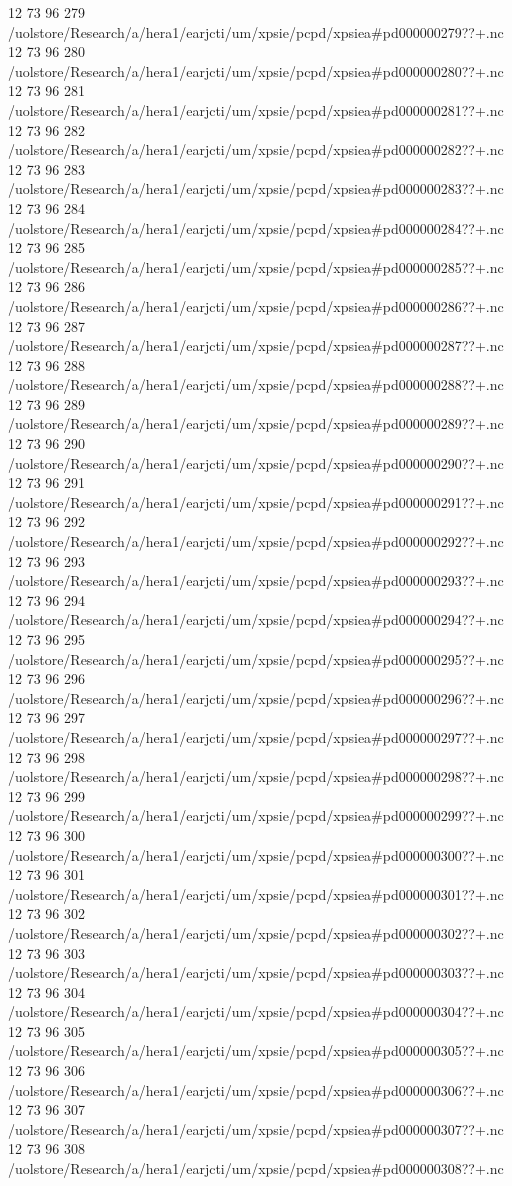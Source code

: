 12 73 96
279
/uolstore/Research/a/hera1/earjcti/um/xpsie/pcpd/xpsiea#pd000000279??+.nc
12 73 96
280
/uolstore/Research/a/hera1/earjcti/um/xpsie/pcpd/xpsiea#pd000000280??+.nc
12 73 96
281
/uolstore/Research/a/hera1/earjcti/um/xpsie/pcpd/xpsiea#pd000000281??+.nc
12 73 96
282
/uolstore/Research/a/hera1/earjcti/um/xpsie/pcpd/xpsiea#pd000000282??+.nc
12 73 96
283
/uolstore/Research/a/hera1/earjcti/um/xpsie/pcpd/xpsiea#pd000000283??+.nc
12 73 96
284
/uolstore/Research/a/hera1/earjcti/um/xpsie/pcpd/xpsiea#pd000000284??+.nc
12 73 96
285
/uolstore/Research/a/hera1/earjcti/um/xpsie/pcpd/xpsiea#pd000000285??+.nc
12 73 96
286
/uolstore/Research/a/hera1/earjcti/um/xpsie/pcpd/xpsiea#pd000000286??+.nc
12 73 96
287
/uolstore/Research/a/hera1/earjcti/um/xpsie/pcpd/xpsiea#pd000000287??+.nc
12 73 96
288
/uolstore/Research/a/hera1/earjcti/um/xpsie/pcpd/xpsiea#pd000000288??+.nc
12 73 96
289
/uolstore/Research/a/hera1/earjcti/um/xpsie/pcpd/xpsiea#pd000000289??+.nc
12 73 96
290
/uolstore/Research/a/hera1/earjcti/um/xpsie/pcpd/xpsiea#pd000000290??+.nc
12 73 96
291
/uolstore/Research/a/hera1/earjcti/um/xpsie/pcpd/xpsiea#pd000000291??+.nc
12 73 96
292
/uolstore/Research/a/hera1/earjcti/um/xpsie/pcpd/xpsiea#pd000000292??+.nc
12 73 96
293
/uolstore/Research/a/hera1/earjcti/um/xpsie/pcpd/xpsiea#pd000000293??+.nc
12 73 96
294
/uolstore/Research/a/hera1/earjcti/um/xpsie/pcpd/xpsiea#pd000000294??+.nc
12 73 96
295
/uolstore/Research/a/hera1/earjcti/um/xpsie/pcpd/xpsiea#pd000000295??+.nc
12 73 96
296
/uolstore/Research/a/hera1/earjcti/um/xpsie/pcpd/xpsiea#pd000000296??+.nc
12 73 96
297
/uolstore/Research/a/hera1/earjcti/um/xpsie/pcpd/xpsiea#pd000000297??+.nc
12 73 96
298
/uolstore/Research/a/hera1/earjcti/um/xpsie/pcpd/xpsiea#pd000000298??+.nc
12 73 96
299
/uolstore/Research/a/hera1/earjcti/um/xpsie/pcpd/xpsiea#pd000000299??+.nc
12 73 96
300
/uolstore/Research/a/hera1/earjcti/um/xpsie/pcpd/xpsiea#pd000000300??+.nc
12 73 96
301
/uolstore/Research/a/hera1/earjcti/um/xpsie/pcpd/xpsiea#pd000000301??+.nc
12 73 96
302
/uolstore/Research/a/hera1/earjcti/um/xpsie/pcpd/xpsiea#pd000000302??+.nc
12 73 96
303
/uolstore/Research/a/hera1/earjcti/um/xpsie/pcpd/xpsiea#pd000000303??+.nc
12 73 96
304
/uolstore/Research/a/hera1/earjcti/um/xpsie/pcpd/xpsiea#pd000000304??+.nc
12 73 96
305
/uolstore/Research/a/hera1/earjcti/um/xpsie/pcpd/xpsiea#pd000000305??+.nc
12 73 96
306
/uolstore/Research/a/hera1/earjcti/um/xpsie/pcpd/xpsiea#pd000000306??+.nc
12 73 96
307
/uolstore/Research/a/hera1/earjcti/um/xpsie/pcpd/xpsiea#pd000000307??+.nc
12 73 96
308
/uolstore/Research/a/hera1/earjcti/um/xpsie/pcpd/xpsiea#pd000000308??+.nc
